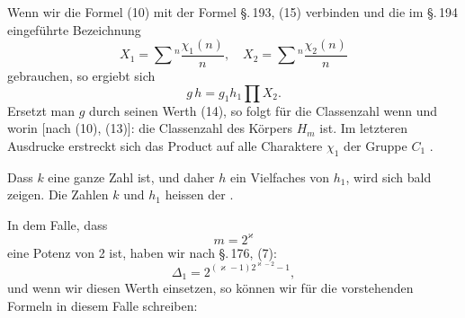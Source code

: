 
Wenn wir die Formel (10) mit der Formel \S.\,193, (15) verbinden und die im \S.\,194 eingeführte Bezeichnung
\[
X_1 = \sum{}^n \frac{\chi_1(n)}{n}, \quad X_2 = \sum{}^n \frac{\chi_2(n)}{n}
\]
gebrauchen, so ergiebt sich
\[
g\,h = g_1 h_1 \prod X_2.
\]
Ersetzt man $g$ durch seinen Werth (14), so folgt für die Classenzahl
wenn
und worin [nach (10), (13)]:
die Classenzahl des Körpers $H_m$ ist. Im letzteren Ausdrucke erstreckt sich das Product auf alle Charaktere $\chi_1$ der Gruppe $C_1$ .

Dass $k$ eine ganze Zahl ist, und daher $h$ ein Vielfaches von $h_1$, wird sich bald zeigen. Die Zahlen $k$ und $h_1$ heissen der .

In dem Falle, dass
\[
m = 2^\varkappa
\]
eine Potenz von 2 ist, haben wir nach \S.\,176, (7):
\[
\varDelta_1 = 2^{(\varkappa-1)2^{\varkappa-2}-1},
\]
und wenn wir diesen Werth einsetzen, so können wir für die vorstehenden Formeln in diesem Falle schreiben:
